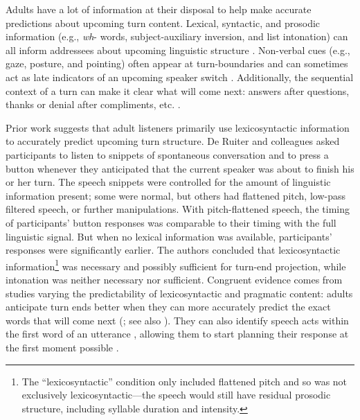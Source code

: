 \documentclass[authoryear, 12pt]{elsarticle}
\begin{document}
Adults have a lot of information at their disposal to help make accurate predictions about upcoming turn content. Lexical, syntactic, and prosodic information (e.g., \textit{wh}- words, subject-auxiliary inversion, and list intonation) can all inform addressees about upcoming linguistic structure \citep{de-ruiter2006, duncan1972, ford1996, torreira2015}. Non-verbal cues (e.g., gaze, posture, and pointing) often appear at turn-boundaries and can sometimes act as late indicators of an upcoming speaker switch \citep{rossano2009, stivers2010}. Additionally, the sequential context of a turn can make it clear what will come next: answers after questions, thanks or denial after compliments, etc. \citep{schegloff2007}.

Prior work suggests that adult listeners primarily use lexicosyntactic information to accurately predict upcoming turn structure. De Ruiter and colleagues \citeyearpar{de-ruiter2006} asked participants to listen to snippets of spontaneous conversation and to press a button whenever they anticipated that the current speaker was about to finish his or her turn. The speech snippets were controlled for the amount of linguistic information present; some were normal, but others had flattened pitch, low-pass filtered speech, or further manipulations. With pitch-flattened speech, the timing of participants' button responses was comparable to their timing with the full linguistic signal. But when no lexical information was available, participants' responses were significantly earlier. The authors concluded that lexicosyntactic information\footnote{The ``lexicosyntactic'' condition only included flattened pitch and so was not exclusively lexicosyntactic---the speech would still have residual prosodic structure, including syllable duration and intensity.} was necessary and possibly sufficient for turn-end projection, while intonation was neither necessary nor sufficient. Congruent evidence comes from studies varying the predictability of lexicosyntactic and pragmatic content: adults anticipate turn ends better when they can more accurately predict the exact words that will come next (\citealp{magyari2012}; see also \citealp{magyari2014}). They can also identify speech acts within the first word of an utterance \citep{gisladottir2015}, allowing them to start planning their response at the first moment possible \citep{bogels2015}.
\end{document}
